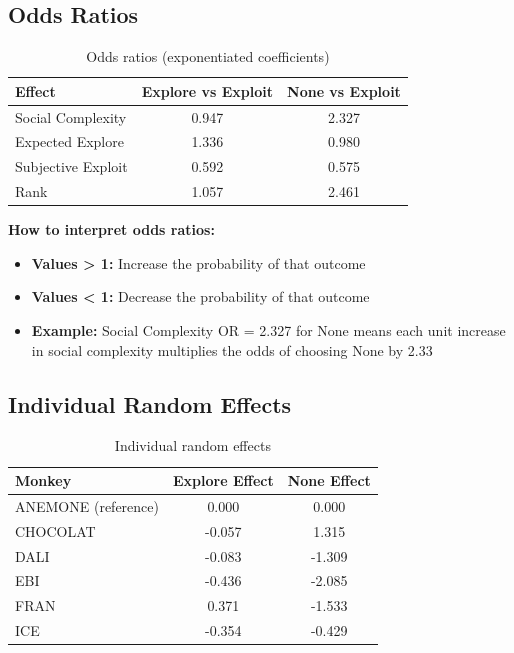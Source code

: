 \documentclass[11pt]{article}
\begin{document}
\subsection{Odds Ratios}

\begin{table}[h]
\centering
\begin{tabular}{lcc}
\toprule
\textbf{Effect} & \textbf{Explore vs Exploit} & \textbf{None vs Exploit} \\
\midrule
Social Complexity & 0.947 & 2.327 \\
Expected Explore & 1.336 & 0.980 \\
Subjective Exploit & 0.592 & 0.575 \\
Rank & 1.057 & 2.461 \\
\bottomrule
\end{tabular}
\caption{Odds ratios (exponentiated coefficients)}
\end{table}

\textbf{How to interpret odds ratios:}
\begin{itemize}
    \item \textbf{Values > 1:} Increase the probability of that outcome
    \item \textbf{Values < 1:} Decrease the probability of that outcome
    \item \textbf{Example:} Social Complexity OR = 2.327 for None means each unit increase in social complexity multiplies the odds of choosing None by 2.33
\end{itemize}

\subsection{Individual Random Effects}

\begin{table}[h]
\centering
\begin{tabular}{lcc}
\toprule
\textbf{Monkey} & \textbf{Explore Effect} & \textbf{None Effect} \\
\midrule
ANEMONE (reference) & 0.000 & 0.000 \\
CHOCOLAT & -0.057 & 1.315 \\
DALI & -0.083 & -1.309 \\
EBI & -0.436 & -2.085 \\
FRAN & 0.371 & -1.533 \\
ICE & -0.354 & -0.429 \\
\bottomrule
\end{tabular}
\caption{Individual random effects}
\end{table}
\end{document}
